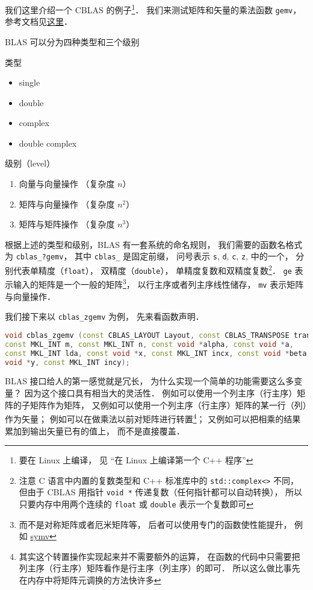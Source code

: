 我们这里介绍一个 CBLAS 的例子\footnote{要在 Linux 上编译， 见 “在 Linux 上编译第一个 C++ 程序”}． 我们来测试矩阵和矢量的乘法函数 \verb|gemv|， 参考文档见\href{https://software.intel.com/en-us/node/834919#88940C4E-0889-46C3-B6CF-F8B6EA6CF4BC}{这里}．

BLAS 可以分为四种类型和三个级别

类型
\begin{itemize}
    \item single
    \item double
    \item complex
    \item double complex
\end{itemize}

级别（level）
\begin{enumerate}
    \item 向量与向量操作 （复杂度 $n$）
    \item 矩阵与向量操作 （复杂度 $n^2$）
    \item 矩阵与矩阵操作 （复杂度 $n^3$）
\end{enumerate}

根据上述的类型和级别，BLAS 有一套系统的命名规则，
我们需要的函数名格式为 \verb|cblas_?gemv|， 其中 \verb|cblas_| 是固定前缀， 问号表示 \verb|s|, \verb|d|, \verb|c|, \verb|z|, 中的一个， 分别代表单精度（\verb|float|）， 双精度（\verb|double|）， 单精度复数和双精度复数\footnote{注意 C 语言中内置的复数类型和 C++ 标准库中的 \lstinline|std::complex<>| 不同， 但由于 CBLAS 用指针 \lstinline|void *| 传递复数（任何指针都可以自动转换）， 所以只要内存中用两个连续的 \lstinline|float| 或 \lstinline|double| 表示一个复数即可}． \verb|ge| 表示输入的矩阵是一个一般的矩阵\footnote{而不是对称矩阵或者厄米矩阵等， 后者可以使用专门的函数使性能提升， 例如 \href{https://software.intel.com/en-us/node/834934}{symv}}， 以行主序或者列主序线性储存， \lstinline|mv| 表示矩阵与向量操作． 



我们接下来以 \verb|cblas_zgemv| 为例， 先来看函数声明．
\begin{lstlisting}[language=cpp]
void cblas_zgemv (const CBLAS_LAYOUT Layout, const CBLAS_TRANSPOSE trans,
const MKL_INT m, const MKL_INT n, const void *alpha, const void *a,
const MKL_INT lda, const void *x, const MKL_INT incx, const void *beta,
void *y, const MKL_INT incy);
\end{lstlisting}

BLAS 接口给人的第一感觉就是冗长， 为什么实现一个简单的功能需要这么多变量？ 因为这个接口具有相当大的灵活性． 例如可以使用一个列主序（行主序）矩阵的子矩阵作为矩阵， 又例如可以使用一个列主序（行主序）矩阵的某一行（列）作为矢量； 例如可以在做乘法以前对矩阵进行转置\footnote{其实这个转置操作实现起来并不需要额外的运算， 在函数的代码中只需要把列主序（行主序）矩阵看作是行主序（列主序）的即可． 所以这么做比事先在内存中将矩阵元调换的方法快许多}； 又例如可以把相乘的结果累加到输出矢量已有的值上， 而不是直接覆盖．

